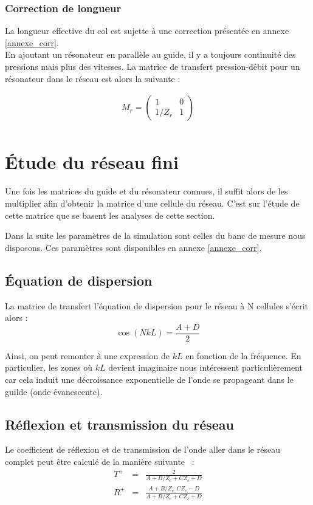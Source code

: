 \subsubsection{Correction de longueur}

La longueur effective du col est sujette à une correction présentée en annexe \ref{annexe_corr}.\\

En ajoutant un résonateur en parallèle au guide, il y a toujours continuité des pressions mais plus des vitesses. La matrice de transfert pression-débit pour un résonateur dans le réseau est alors la suivante :

\begin{eqnarray*}
M_{r} = \begin{pmatrix} 1 &  0 \\ 1 /Z_{r} & 1  \end{pmatrix}\\
\end{eqnarray*}

\section{Étude du réseau fini}

Une fois les matrices du guide et du résonateur connues, il suffit alors de les multiplier afin d'obtenir la matrice d'une cellule du réseau. C'est sur l'étude de cette matrice que se basent les analyses de cette section. 

Dans la suite les paramètres de la simulation sont celles du banc de mesure nous disposons. Ces paramètres sont disponibles en annexe \ref{annexe_corr}.

\subsection{Équation de dispersion}
La matrice de transfert l'équation de dispersion pour le réseau à N cellules s'écrit alors : 
\begin{equation}\label{eq_dispersion}
\cos(NkL) = \frac{A+D}{2} 
\end{equation}

Ainsi, on peut remonter à une expression de $kL$ en fonction de la fréquence. En particulier, les zones où $kL$ devient imaginaire nous intéressent particulièrement car cela induit une décroissance exponentielle de l'onde se propageant dans le guilde (onde évanescente).

\subsection{Réflexion et transmission du réseau}
Le coefficient de réflexion et de transmission de l'onde aller dans le réseau complet peut être calculé de la manière suivante ~\cite{guide_dalmont}: 
\begin{eqnarray}
T^{+} & = & \frac{2}{A + B/Z_c + C Z_c + D} \\
R^{+} & = & \frac{A + B / Z_c_ - C Z_c -D}{A + B/Z_c + C Z_c + D} 
\end{eqnarray}

